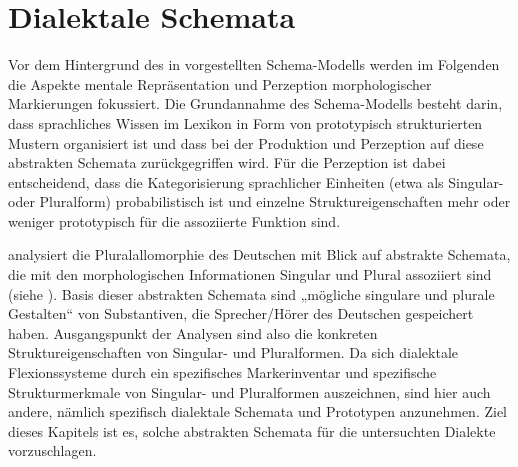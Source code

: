 \section{Dialektale Schemata}
\label{sec:10.3}
Vor dem Hintergrund des in  vorgestellten Schema-Modells werden im Folgenden die Aspekte mentale Repräsentation und Perzeption morphologischer Markierungen fokussiert. Die Grundannahme des Schema-Modells besteht darin, dass sprachliches Wissen im Lexikon in Form von prototypisch strukturierten Mustern organisiert ist und dass bei der Produktion und Perzeption auf diese abstrakten Schemata zurückgegriffen wird. Für die Perzeption ist dabei entscheidend, dass die Kategorisierung sprachlicher Einheiten (etwa als Singular- oder Pluralform) probabilistisch ist und einzelne Struktureigenschaften mehr oder weniger prototypisch für die assoziierte Funktion sind.

 analysiert die Pluralallomorphie des Deutschen mit Blick auf abstrakte Schemata, die mit den morphologischen Informationen Singular und Plural assoziiert sind (siehe ). Basis dieser abstrakten Schemata sind „mögliche singulare und plurale Gestalten“ \citep[85]{Köpcke1993} von Substantiven, die Sprecher/Hörer des Deutschen gespeichert haben. Ausgangspunkt der Analysen sind also die konkreten Struktureigenschaften von Singular- und Pluralformen. Da sich dialektale Flexionssysteme durch ein spezifisches Markerinventar und spezifische Strukturmerkmale von Singular- und Pluralformen auszeichnen, sind hier auch andere, nämlich spezifisch dialektale Schemata und Prototypen anzunehmen. Ziel dieses Kapitels ist es, solche abstrakten Schemata für die untersuchten Dialekte vorzuschlagen.

